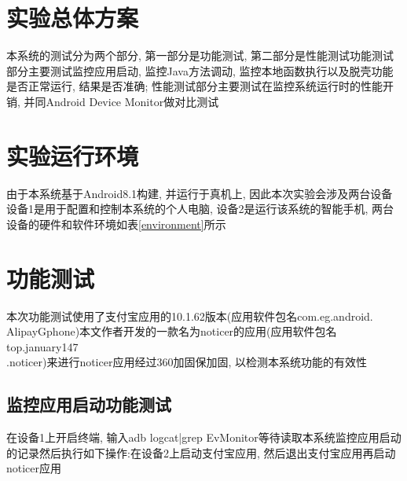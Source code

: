 \section{实验总体方案}
本系统的测试分为两个部分, 第一部分是功能测试, 第二部分是性能测试\juhao 功能测试部分主要测试监控应用启动, 监控Java方法调动, 监控本地函数执行以及脱壳功能是否正常运行, 结果是否准确; 性能测试部分主要测试在监控系统运行时的性能开销, 并同Android Device Monitor做对比测试\juhao 
\section{实验运行环境}
由于本系统基于Android8.1构建, 并运行于真机上, 因此本次实验会涉及两台设备\juhao 设备1是用于配置和控制本系统的个人电脑, 设备2是运行该系统的智能手机, 两台设备的硬件和软件环境如表\ref{environment}所示\juhao

\begin{table}[ht]
	\centering
	\caption{实验设备环境}
	\label{environment}
\end{table}
\section{功能测试}
本次功能测试使用了支付宝应用的10.1.62版本(应用软件包名com.eg.android.\\AlipayGphone)本文作者开发的一款名为noticer的应用(应用软件包名top.january147\\.noticer)来进行\juhao noticer应用经过360加固保加固, 以检测本系统功能的有效性\juhao 
\subsection{监控应用启动功能测试}
在设备1上开启终端, 输入adb logcat|grep EvMonitor等待读取本系统监控应用启动的记录\juhao 然后执行如下操作:在设备2上启动支付宝应用, 然后退出支付宝应用再启动noticer应用\juhao


